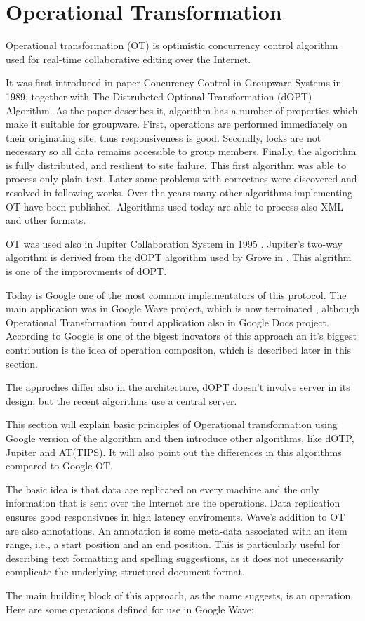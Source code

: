 \documentclass[12pt,oneside]{fithesis2}
\begin{document}
\section{Operational Transformation}
\par Operational transformation (OT) is optimistic concurrency control algorithm used for real-time collaborative editing over the Internet. 
\par It was first introduced in paper Concurency Control in Groupware Systems\cite{Ellis} in 1989, together with The Distrubeted Optional Transformation (dOPT) Algorithm. As the paper describes it, algorithm has a number of properties which make it suitable for groupware. First, operations are performed immediately on their originating site, thus responsiveness is good. Secondly, locks are not necessary so all data remains accessible to group members. Finally, the algorithm is fully distributed, and resilient to site failure. This first algorithm was able to process only plain text. Later some problems with correctnes were discovered and resolved in following works. Over the years many other algorithms implementing OT have been published. Algorithms used today are able to process also XML and other formats. \par OT was used also in Jupiter Collaboration System in 1995 \cite{Jupiter}. Jupiter's two-way algorithm is derived from the dOPT algorithm used by Grove in \cite{Ellis}. This algrithm is one of the imporovments of dOPT. \par Today is Google one of the most common implementators of this protocol. The main application was in Google Wave project, which is now terminated , although Operational Transformation found application also in Google Docs project. According to \cite{Spiewak} Google is one of the bigest inovators of this approach an it's biggest contribution is the idea of operation compositon, which is described later in this section. \par The approches differ also in the architecture, dOPT doesn't involve server in its design, but the recent algorithms use a central server.
\par This section will explain basic principles of Operational transformation using Google version of the algorithm and then introduce other algorithms, like dOTP, Jupiter and AT(TIPS). It will also point out the differences in this algorithms compared to Google OT. 
\par The basic idea is that data are replicated on every machine and the only information that is sent over the Internet are the operations. Data replication ensures good responsivnes in high latency enviroments. Wave's addition to OT are also annotations. An annotation is some meta-data associated with an item range, i.e., a start position and an end position. This is particularly useful for describing text formatting and spelling suggestions, as it does not unecessarily complicate the underlying structured document format.\cite{Google} \par The main building block of this approach, as the name suggests, is an operation. Here are some operations defined for use in Google Wave\cite{Google}:
\end{document}
